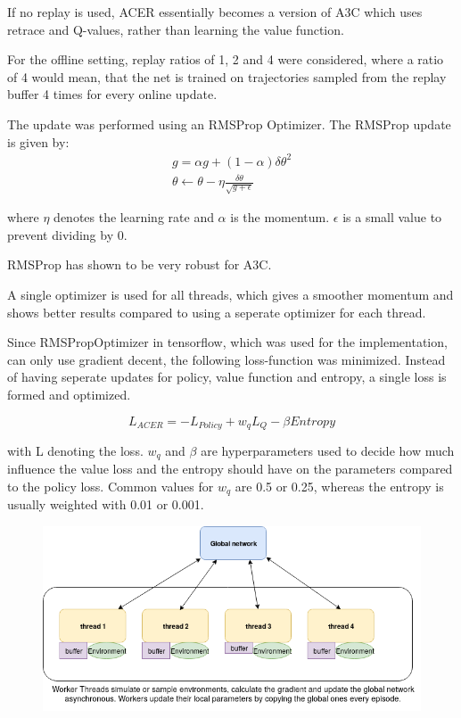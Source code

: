 If no replay is used, ACER essentially becomes a version of A3C which uses retrace and Q-values, rather than learning the value function. \citep{A3C}

For the offline setting, replay ratios of 1, 2 and 4 were considered, where a ratio of 4 would mean, that the net is trained on trajectories sampled from the replay buffer 4 times for every online update.

The update was performed using an RMSProp Optimizer.
The RMSProp update is given by:
\begin{align}
g = \alpha g + (1- \alpha) \delta \theta^2 \\ \theta \gets \theta - \eta \frac{\delta \theta}{ \sqrt{g+\epsilon}}
\end{align}

where $\eta$ denotes the learning rate and $\alpha$ is the momentum. $\epsilon$ is a small value to prevent dividing by 0.

RMSProp has shown to be very robust for A3C. \citep{A3C}

A single optimizer is used for all threads, which gives a smoother momentum and shows better results compared to using a seperate optimizer for each thread.

Since RMSPropOptimizer in tensorflow, which was used for the implementation, can only use gradient decent, the following loss-function was minimized. Instead of having seperate updates for policy, value function and entropy, a single loss is formed and optimized.

\begin{equation}
L_{ACER} = - L_{Policy} + w_q L_{Q} - \beta Entropy
\end{equation}

with L denoting the loss. $w_q$ and $\beta$ are hyperparameters used to decide how much influence the value loss and the entropy should have on the parameters compared to the policy loss. Common values for $w_q$ are 0.5 or 0.25, whereas the entropy is usually weighted with 0.01 or 0.001.

\begin{figure}
\begin{center}

\includegraphics[scale=0.5]{bilder/ACERarchitecture.png}
\end{center}

\end{figure}
\pagebreak
